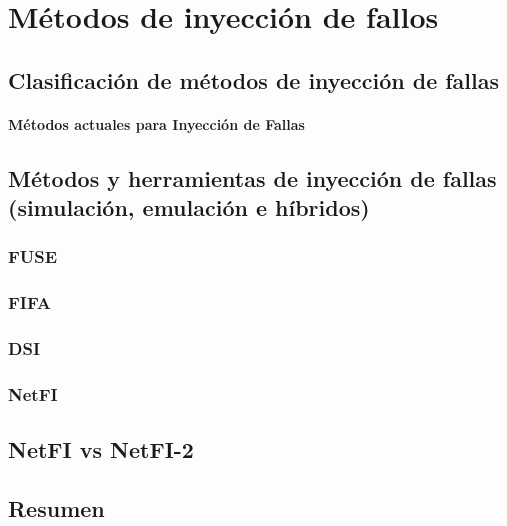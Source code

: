 \chapter{Métodos de inyección de fallos}\label{marco del trabajo}

\section{Clasificación de métodos de inyección de fallas}
	\subsubsection{Métodos actuales para Inyección de Fallas}

\section{ Métodos y herramientas de inyección de fallas (simulación, emulación e híbridos)}
	\subsection{FUSE}
	\subsection{FIFA}
	\subsection{DSI}
	\subsection{NetFI}
	
\section{NetFI vs NetFI-2}

\section{Resumen}